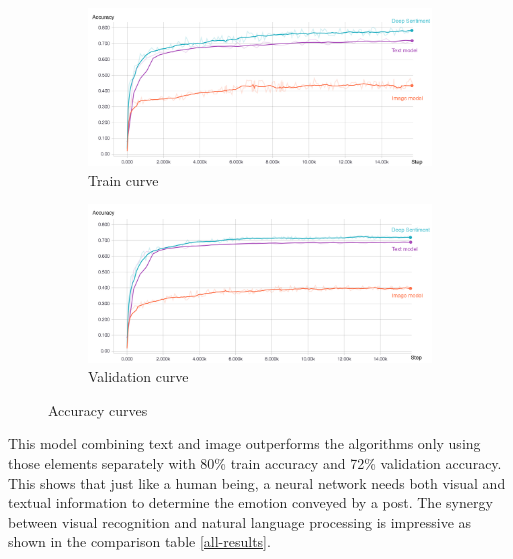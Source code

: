 \documentclass{article} %
\begin{document}
\begin{figure}[H]
    \begin{subfigure}[t]{.5\textwidth}
        \vskip 0pt %
        \centering
        \includegraphics[width=\linewidth]{Images/train.jpg}
        \caption{Train curve}
   \end{subfigure}
   \begin{subfigure}[t]{.5\textwidth}
       \vskip 0pt
       \centering
       \includegraphics[width=\linewidth]{Images/validation.jpg}
       \caption{Validation curve}
    \end{subfigure}
    \caption{Accuracy curves}
    \label{train-validation}
\end{figure}



This model combining text and image outperforms the algorithms only using those elements separately with 80\% train accuracy and 72\% validation accuracy. This shows that just like a human being, a neural network needs both visual and textual information to determine the emotion conveyed by a post. The synergy between visual recognition and natural language processing is impressive as shown in the comparison table \ref{all-results}.
\end{document}
